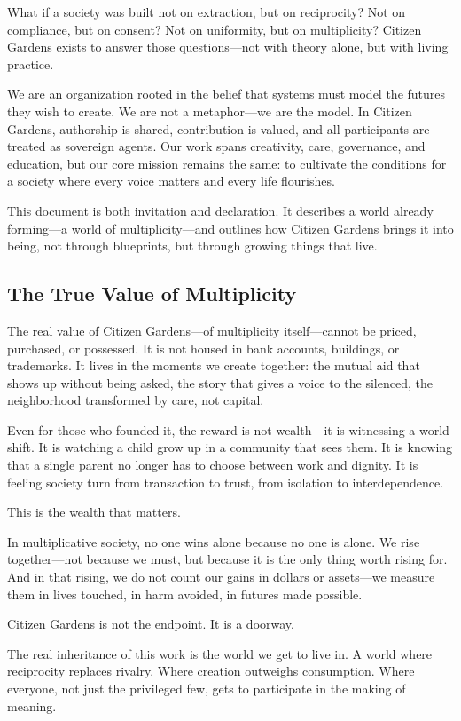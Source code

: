 \documentclass[12pt]{article}
\begin{document}
What if a society was built not on extraction, but on reciprocity? Not on compliance, but on consent? Not on uniformity, but on multiplicity? Citizen Gardens exists to answer those questions—not with theory alone, but with living practice.

We are an organization rooted in the belief that systems must model the futures they wish to create. We are not a metaphor—we are the model. In Citizen Gardens, authorship is shared, contribution is valued, and all participants are treated as sovereign agents. Our work spans creativity, care, governance, and education, but our core mission remains the same: to cultivate the conditions for a society where every voice matters and every life flourishes.

This document is both invitation and declaration. It describes a world already forming—a world of multiplicity—and outlines how Citizen Gardens brings it into being, not through blueprints, but through growing things that live.

\subsection{The True Value of Multiplicity}

The real value of Citizen Gardens—of multiplicity itself—cannot be priced, purchased, or possessed. It is not housed in bank accounts, buildings, or trademarks. It lives in the moments we create together: the mutual aid that shows up without being asked, the story that gives a voice to the silenced, the neighborhood transformed by care, not capital.

Even for those who founded it, the reward is not wealth—it is witnessing a world shift. It is watching a child grow up in a community that sees them. It is knowing that a single parent no longer has to choose between work and dignity. It is feeling society turn from transaction to trust, from isolation to interdependence.

This is the wealth that matters.

In multiplicative society, no one wins alone because no one is alone. We rise together—not because we must, but because it is the only thing worth rising for. And in that rising, we do not count our gains in dollars or assets—we measure them in lives touched, in harm avoided, in futures made possible.

Citizen Gardens is not the endpoint. It is a doorway.

The real inheritance of this work is the world we get to live in. A world where reciprocity replaces rivalry. Where creation outweighs consumption. Where everyone, not just the privileged few, gets to participate in the making of meaning.
\end{document}
